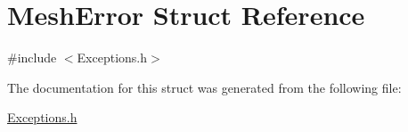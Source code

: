 \hypertarget{structMeshError}{}\section{Mesh\+Error Struct Reference}
\label{structMeshError}


{\ttfamily \#include $<$Exceptions.\+h$>$}



The documentation for this struct was generated from the following file\+:\begin{DoxyCompactItemize}
\item 
\hyperlink{Exceptions_8h}{Exceptions.\+h}\end{DoxyCompactItemize}

